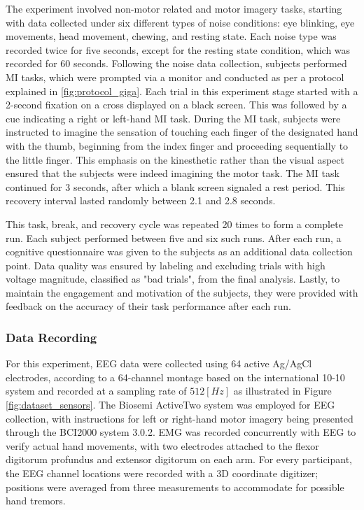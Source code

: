 The experiment involved non-motor related and motor imagery tasks, starting with data collected under six different types of noise conditions: eye blinking, eye movements, head movement, chewing, and resting state. Each noise type was recorded twice for five seconds, except for the resting state condition, which was recorded for 60 seconds. Following the noise data collection, subjects performed MI tasks, which were prompted via a monitor and conducted as per a protocol explained in \cref{fig:protocol_giga}. Each trial in this experiment stage started with a 2-second fixation on a cross displayed on a black screen. This was followed by a cue indicating a right or left-hand MI task. During the MI task, subjects were instructed to imagine the sensation of touching each finger of the designated hand with the thumb, beginning from the index finger and proceeding sequentially to the little finger. This emphasis on the kinesthetic rather than the visual aspect ensured that the subjects were indeed imagining the motor task. The MI task continued for 3 seconds, after which a blank screen signaled a rest period. This recovery interval lasted randomly between 2.1 and 2.8 seconds.

This task, break, and recovery cycle was repeated 20 times to form a complete run. Each subject performed between five and six such runs. After each run, a cognitive questionnaire was given to the subjects as an additional data collection point. Data quality was ensured by labeling and excluding trials with high voltage magnitude, classified as "bad trials", from the final analysis. Lastly, to maintain the engagement and motivation of the subjects, they were provided with feedback on the accuracy of their task performance after each run.



\subsubsection{Data Recording}

For this experiment, EEG data were collected using 64 active Ag/AgCl electrodes, according to a 64-channel montage based on the international 10-10 system and recorded at a sampling rate of $512 [Hz]$ as illustrated in Figure \ref{fig:dataset_sensors}. The Biosemi ActiveTwo system was employed for EEG collection, with instructions for left or right-hand motor imagery being presented through the BCI2000 system 3.0.2. EMG was recorded concurrently with EEG to verify actual hand movements, with two electrodes attached to the flexor digitorum profundus and extensor digitorum on each arm. For every participant, the EEG channel locations were recorded with a 3D coordinate digitizer; positions were averaged from three measurements to accommodate for possible hand tremors.

